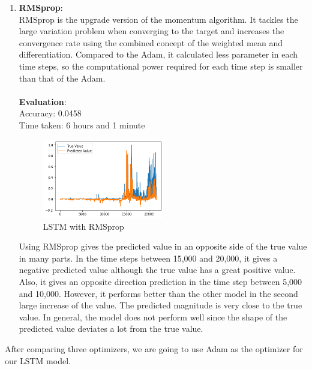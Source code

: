 \documentclass[11pt,a4paper]{article}
\begin{document}
\begin{enumerate}
        \item
        {
            \textbf{RMSprop}: \\
            RMSprop is the upgrade version of the momentum algorithm. It tackles the large variation problem when converging to the target and increases the convergence rate using the combined concept of the weighted mean and differentiation. Compared to the Adam, it calculated less parameter in each time steps, so the computational power required for each time step is smaller than that of the Adam. \\
            \\
            \textbf{Evaluation}: \\
            Accuracy: 0.0458 \\
            Time taken: 6 hours and 1 minute
            \begin{figure}[H]
                \centering
                \includegraphics[width = 0.5\textwidth]{crypto/plot/LSTM_RMSprop.png}
                \caption{LSTM with RMSprop}
                \label{fig:LSTM_RMSprop}
            \end{figure}
            Using RMSprop gives the predicted value in an opposite side of the true value in many parts. In the time steps between 15,000 and 20,000, it gives a negative predicted value although the true value has a great positive value. Also, it gives an opposite direction prediction in the time step between 5,000 and 10,000. However, it performs better than the other model in the second large increase of the value. The predicted magnitude is very close to the true value. In general, the model does not perform well since the shape of the predicted value deviates a lot from the true value.
        }
    \end{enumerate}
    After comparing three optimizers, we are going to use Adam as the optimizer for our LSTM model.
    
\end{document}
